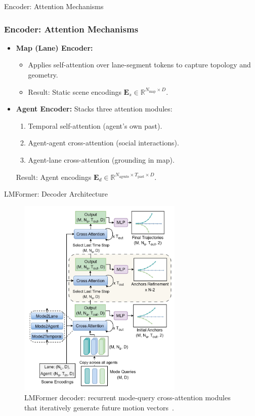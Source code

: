 \documentclass[10pt,aspectratio=169]{beamer}
\begin{document}
\begin{frame}{Encoder: Attention Mechanisms}
    \frametitle{Encoder: Attention Mechanisms}
    \begin{itemize}
        \item<1-> \textbf{Map (Lane) Encoder:}
              \begin{itemize}
                \item Applies self-attention over lane-segment tokens to capture topology and geometry.
                \item Result: Static scene encodings \(\mathbf{E}_s \in \mathbb{R}^{N_{\text{map}} \times D}\).
              \end{itemize}
        \item<2-> \textbf{Agent Encoder:} Stacks three attention modules:
              \begin{enumerate}
                \item Temporal self-attention (agent's own past).
                \item Agent-agent cross-attention (social interactions).
                \item Agent-lane cross-attention (grounding in map).
              \end{enumerate}
              Result: Agent encodings \(\mathbf{E}_d \in \mathbb{R}^{N_{\text{agents}} \times T_{\text{past}} \times D}\).
    \end{itemize}
\end{frame}

\begin{frame}{LMFormer: Decoder Architecture}
    \begin{figure}
        \centering
        \includegraphics[width=0.7\textwidth]{docs/figures/lmformer_arch_decoder.png}
        \caption{LMFormer decoder: recurrent mode-query cross-attention modules that iteratively generate future motion vectors~\cite{lmformerYadav2025}.}
    \end{figure}
\end{frame}
\end{document}
